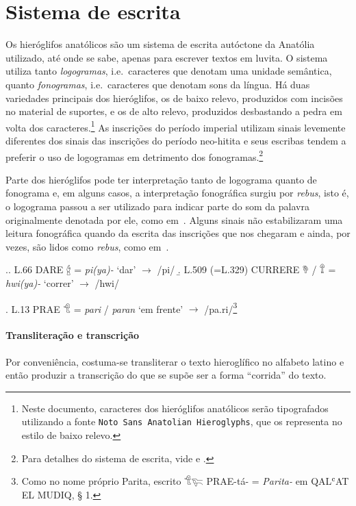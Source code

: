 
\section{Sistema de escrita}

Os hieróglifos anatólicos são um sistema de escrita autóctone da Anatólia
utilizado, até onde se sabe, apenas para escrever textos em luvita.
O sistema utiliza tanto \emph{logogramas}, i.e.\ caracteres que denotam uma
unidade semântica, quanto \emph{fonogramas}, i.e.\ caracteres que denotam sons da
língua.
Há duas variedades principais dos hieróglifos, os de baixo relevo, produzidos
com incisões no material de suportes, e os de alto relevo, produzidos
desbastando a pedra em volta dos caracteres.\footnote{Neste documento, 
	caracteres dos hieróglifos anatólicos serão tipografados utilizando a fonte 
	{\tiny\texttt{Noto Sans Anatolian Hieroglyphs}}, que os representa no estilo de 
baixo relevo.}
As inscrições do período imperial utilizam sinais levemente diferentes dos
sinais das inscrições do período neo-hitita e seus escribas tendem a preferir 
o uso de logogramas em detrimento dos fonogramas.\footnote{%
	Para detalhes do sistema de escrita, vide
	\citet[pp.\ 6ff.\ e pp.\ 23ff.]{CHLI11} e \citet[pp. 354ff.]{CHLI3}.
}

	
Parte dos hieróglifos pode ter interpretação tanto de logograma quanto de
fonograma e, em alguns casos, a interpretação fonográfica surgiu por
\emph{rebus}, isto é, o logograma passou a ser utilizado para indicar parte do
som da palavra originalmente denotada por ele, como em~\Next.
Alguns sinais não estabilizaram uma leitura fonográfica quando da escrita das
inscrições que nos chegaram e ainda, por vezes, são lidos como \emph{rebus},
como em~\NNext.

\ex.\a. L.66 DARE 𔑈 = \emph{pi{(ya)}-} `dar' $\rightarrow$ /pi/
\b. L.509 (=L.329) CURRERE 𔘰 \slash{} 𔕰 = \emph{hwi{(ya)}-} `correr' $\rightarrow$
/hwi/

\ex. L.13 PRAE 𔐎 = \emph{pari} \slash{} \emph{paran} `em frente' $\rightarrow$
/pa.ri/\footnote{Como no nome próprio Parita, escrito 𔐎𔐞 PRAE-tá- =
\emph{Parita-} em QALʿAT EL MUDIQ, § 1.}

\paragraph{Transliteração e transcrição}
Por conveniência, costuma-se transliterar o texto hieroglífico no alfabeto latino
e então produzir a transcrição do que se supõe ser a forma ``corrida'' do texto.

